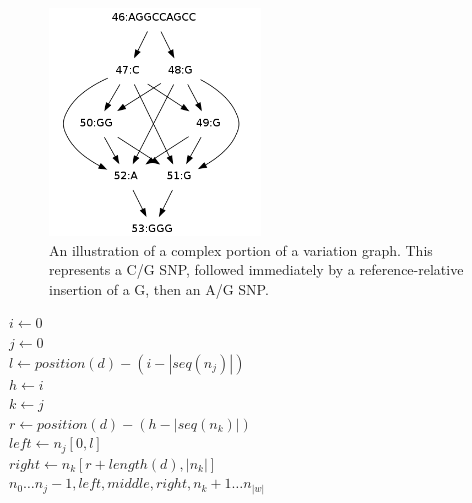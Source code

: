 \documentclass{article}
\begin{document}
\begin{figure}[t]
\centering
\includegraphics[width=0.5\textwidth]{figures/complexjunction}
\caption{\label{fig:complexjunction}
  An illustration of a complex portion of a variation graph. This represents a C/G SNP, followed immediately by a reference-relative insertion of a G, then an A/G SNP.
}
\end{figure}

\begin{function}[h!]
  \label{func:cut}
  $i \gets 0$ \\
  $j \gets 0$ \\
  $l \gets position(d) - (i - |seq(n_j)|)$ \\
  $h \gets i$ \\
  $k \gets j$ \\
  $r \gets position(d) - (h - |seq(n_k)|)$ \\
  $left \gets n_j[0, l]$ \\
  $right \gets n_k[r+length(d), |n_k|]$ \\
  \Return $n_0\ldots n_j-1, left, middle, right, n_k+1\ldots n_{|w|}$ \\
  \caption{Cut($w$, $d$) cuts path $w$ as defined by difference $d$}
\end{function}
\end{document}
